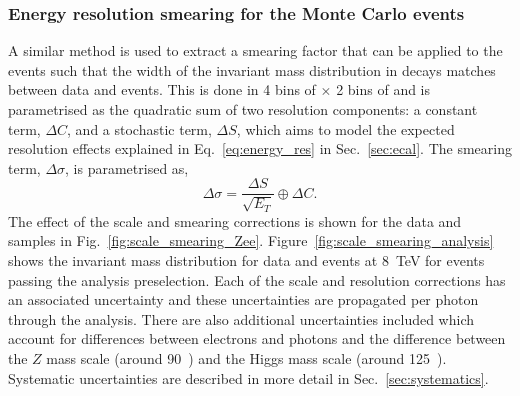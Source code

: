 \subsubsection{Energy resolution smearing for the Monte Carlo events}

A similar method is used to extract a smearing factor that can be applied to the \MC events such that the width of the invariant mass distribution in \Zee decays matches between data and \MC events. This is done in 4 bins of \eta $\times$ 2 bins of \rnine and is parametrised as the quadratic sum of two resolution components: a constant term, $\Delta C$, and a stochastic term, $\Delta S$, which aims to model the expected resolution effects explained in Eq.~\ref{eq:energy_res} in Sec.~\ref{sec:ecal}. The smearing term, $\Delta\sigma$, is parametrised as,
\begin{equation}
  \Delta\sigma = \frac{\Delta S}{\sqrt{E_{T}}} \oplus \Delta C.
\end{equation}
The effect of the scale and smearing corrections is shown for the \Zee data and \MC samples in Fig.~\ref{fig:scale_smearing_Zee}. Figure~\ref{fig:scale_smearing_analysis} shows the \Zee invariant mass distribution for data and \MC events at 8~TeV for events passing the analysis preselection. Each of the scale and resolution corrections has an associated uncertainty and these uncertainties are propagated per photon through the analysis. There are also additional uncertainties included which account for differences between electrons and photons and the difference between the $Z$ mass scale (around 90~\GeV) and the Higgs mass scale (around 125~\GeV). Systematic uncertainties are described in more detail in Sec.~\ref{sec:systematics}.

